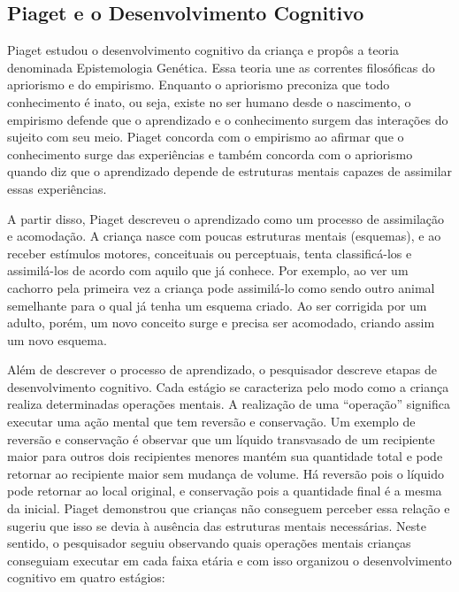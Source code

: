 
\subsection{Piaget e o Desenvolvimento Cognitivo}
Piaget estudou o desenvolvimento cognitivo da criança e propôs a teoria denominada Epistemologia Genética. Essa teoria une as correntes filosóficas do apriorismo e do empirismo. Enquanto o apriorismo preconiza que todo conhecimento é inato, ou seja, existe no ser humano desde o nascimento, o empirismo defende que o aprendizado e o conhecimento surgem das interações do sujeito com seu meio. Piaget concorda com o empirismo ao afirmar que o conhecimento surge das experiências e também concorda com o apriorismo quando diz que o aprendizado depende de estruturas mentais capazes de assimilar essas experiências.

A partir disso, Piaget descreveu o aprendizado como um processo de assimilação e acomodação. A criança nasce com poucas estruturas mentais (esquemas), e ao receber estímulos motores, conceituais ou perceptuais, tenta classificá-los e assimilá-los de acordo com aquilo que já conhece. Por exemplo, ao ver um cachorro pela primeira vez a criança pode assimilá-lo como sendo outro animal semelhante para o qual já tenha um esquema criado. Ao ser corrigida por um adulto, porém, um novo conceito surge e precisa ser acomodado, criando assim um novo esquema.

Além de descrever o processo de aprendizado, o pesquisador descreve etapas de desenvolvimento cognitivo. Cada estágio se caracteriza pelo modo como a criança realiza determinadas operações mentais. A realização de uma “operação” significa executar uma ação mental que tem reversão e conservação. Um exemplo de reversão e conservação é observar que um líquido transvasado de um recipiente maior para outros dois recipientes menores mantém sua quantidade total e pode retornar ao recipiente maior sem mudança de volume. Há reversão pois o líquido pode retornar ao local original, e conservação pois a quantidade final é a mesma da inicial. Piaget demonstrou que crianças não conseguem perceber essa relação e sugeriu que isso se devia à ausência das estruturas mentais necessárias. Neste sentido, o pesquisador seguiu observando quais operações mentais crianças conseguiam executar em cada faixa etária e com isso organizou o desenvolvimento cognitivo em quatro estágios:

